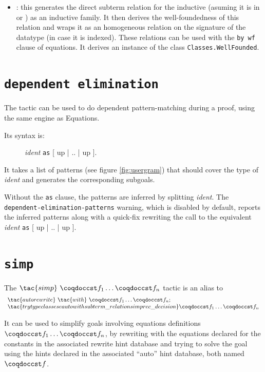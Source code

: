 \begin{itemize}
\item {}: this generates the direct subterm relation for the
  inductive (asuming it is in  or ) as an inductive family.
  It then derives the well-foundedness of this relation and wraps it
  as an homogeneous relation on the signature of the datatype (in case
  it is indexed). These relations can be used with the \texttt{by wf}
  clause of equations. It derives an instance of the class
  \texttt{Classes.WellFounded}.

\end{itemize}

\section{\texttt{dependent elimination}}

The  tactic can be used to do dependent
pattern-matching during a proof, using the same engine as Equations.

Its syntax is:
\begin{figure}[h]
   \textit{ident} \texttt{as} [ up | .. | up ].
\end{figure}

It takes a list of patterns (see figure \ref{fig:usergram}) that should cover the type of \textit{ident}
and generates the corresponding subgoals.

Without the \texttt{as} clause, the patterns are inferred by splitting
\textit{ident}. The \texttt{dependent-elimination-patterns} warning, which
is disabled by default, reports the inferred patterns along with a
quick-fix rewriting the call to the equivalent
 \textit{ident} \texttt{as} [ up | .. | up ].


\section{\texttt{simp}}

The $\tac{simp}~\cst{f}_1 \ldots \cst{f}_n$ tactic is an alias to
\[\begin{array}{l}
  \tac{autorewrite}~\tac{with}~\cst{f}_1 \ldots \cst{f}_n ; \\
  \tac{try typeclasses eauto with subterm\_relation simp rec\_decision} \cst{f}_1
  \ldots \cst{f}_n
\end{array}\]

It can be used to simplify goals involving equations definitions
$\cst{f}_1 \ldots \cst{f}_n$, by rewriting with the equations declared
for the constants in the associated rewrite hint database and trying to
solve the goal using the hints declared in the associated ``auto'' hint
database, both named $\cst{f}$.

